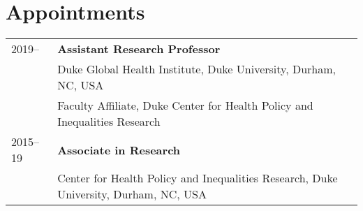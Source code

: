 \vspace{3ex}
\section*{Appointments}
\begin{longtable}{p{} p{}}
2019-- & \textbf{Assistant Research Professor}\\
		             & Duke Global Health Institute, Duke University, Durham, NC, USA \\
		             & Faculty Affiliate, Duke Center for Health Policy and Inequalities Research\\

2015--19 & \textbf{Associate in Research}\\
& Center for Health Policy and Inequalities Research, Duke University, Durham, NC, USA \\
\end{longtable}
